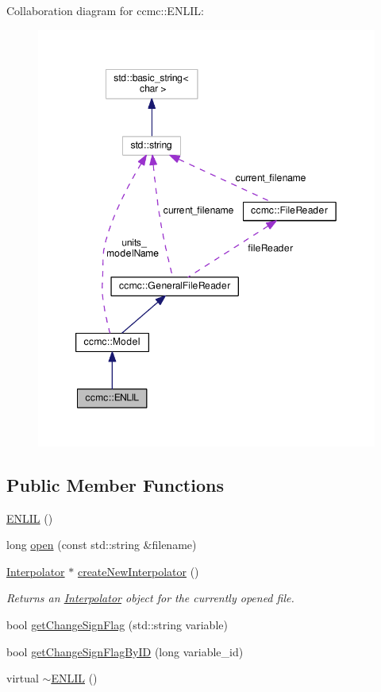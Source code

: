 Collaboration diagram for ccmc\-:\-:E\-N\-L\-I\-L\-:
\nopagebreak
\begin{figure}[H]
\begin{center}
\leavevmode
\includegraphics[width=349pt]{classccmc_1_1_e_n_l_i_l__coll__graph}
\end{center}
\end{figure}
\subsection*{Public Member Functions}
\begin{DoxyCompactItemize}
\item 
\hyperlink{classccmc_1_1_e_n_l_i_l_a38a8d599775cb5da6be25288b9bb5ae1}{E\-N\-L\-I\-L} ()
\item 
long \hyperlink{classccmc_1_1_e_n_l_i_l_a7a1ec843b7fc7a86d6b8e2ac3d65b41f}{open} (const std\-::string \&filename)
\item 
\hyperlink{classccmc_1_1_interpolator}{Interpolator} $\ast$ \hyperlink{classccmc_1_1_e_n_l_i_l_a861fdf6c5b4f73d0e0b4cfc66f55598b}{create\-New\-Interpolator} ()
\begin{DoxyCompactList}\small\item\em Returns an \hyperlink{classccmc_1_1_interpolator}{Interpolator} object for the currently opened file.  \end{DoxyCompactList}\item 
bool \hyperlink{classccmc_1_1_e_n_l_i_l_a109de918c637e24533e88100f1ae53bd}{get\-Change\-Sign\-Flag} (std\-::string variable)
\item 
bool \hyperlink{classccmc_1_1_e_n_l_i_l_a93e9e996febbd953b69b6e7c30b999ac}{get\-Change\-Sign\-Flag\-By\-I\-D} (long variable\-\_\-id)
\item 
virtual \hyperlink{classccmc_1_1_e_n_l_i_l_a7f0df091dd0047b5c3401a22f362e0d6}{$\sim$\-E\-N\-L\-I\-L} ()
\end{DoxyCompactItemize}
